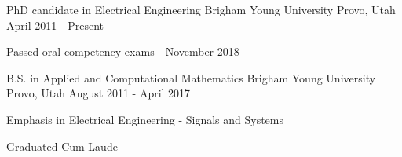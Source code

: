 

\begin{cventries}

  \cventry
    {PhD candidate in Electrical Engineering} %
    {Brigham Young University} %
    {Provo, Utah} %
    {April 2011 - Present} %
    {
      \begin{cvitems}
      \item {Passed oral competency exams - November 2018}
      \end{cvitems}
    }
  \cventry
    {B.S. in Applied and Computational Mathematics} %
    {Brigham Young University} %
    {Provo, Utah} %
    {August 2011 - April 2017} %
    {
      \begin{cvitems} %
        \item {Emphasis in Electrical Engineering - Signals and Systems}
        \item {Graduated Cum Laude}
      \end{cvitems}
    }

\end{cventries}
